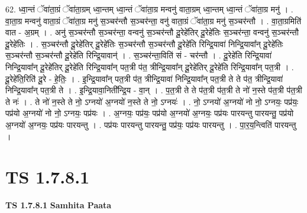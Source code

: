\documentclass[17pt]{extarticle}
\begin{document}
62. ध्वा॒न्तं ॅवा॑ता॒ग्रं ॅवा॑ता॒ग्रम् ध्वा॒न्तम् ध्वा॒न्तं ॅवा॑ता॒ग्र मन्वनु॑ वाता॒ग्रम् ध्वा॒न्तम् ध्वा॒न्तं ॅवा॑ता॒ग्र मनु॑ । . वा॒ता॒ग्र मन्वनु॑ वाता॒ग्रं ॅवा॑ता॒ग्र मनु॑ स॒ञ्चर॑न्तौ स॒ञ्चर॑न्ता॒ वनु॑ वाता॒ग्रं ॅवा॑ता॒ग्र मनु॑ स॒ञ्चर॑न्तौ । . वा॒ता॒ग्रमिति॑ वात - अ॒ग्रम् । . अनु॑ स॒ञ्चर॑न्तौ स॒ञ्चर॑न्ता॒ वन्वनु॑ स॒ञ्चर॑न्तौ दू॒रेहे॑तिर् दू॒रेहे॑तिः स॒ञ्चर॑न्ता॒ वन्वनु॑ स॒ञ्चर॑न्तौ दू॒रेहे॑तिः । . स॒ञ्चर॑न्तौ दू॒रेहे॑तिर् दू॒रेहे॑तिः स॒ञ्चर॑न्तौ स॒ञ्चर॑न्तौ दू॒रेहे॑ति रिन्द्रि॒यावा॑ निन्द्रि॒यावा᳚न् दू॒रेहे॑तिः स॒ञ्चर॑न्तौ स॒ञ्चर॑न्तौ दू॒रेहे॑ति रिन्द्रि॒यावान्॑ । . स॒ञ्चर॑न्ता॒विति॑ सं - चर॑न्तौ । . दू॒रेहे॑ति रिन्द्रि॒यावा॑ निन्द्रि॒यावा᳚न् दू॒रेहे॑तिर् दू॒रेहे॑ति रिन्द्रि॒यावा᳚न् पत॒त्री प॑त॒ त्रीन्द्रि॒यावा᳚न् दू॒रेहे॑तिर् दू॒रेहे॑ति रिन्द्रि॒यावा᳚न् पत॒त्री । . दू॒रेहे॑ति॒रिति॑ दू॒रे - हे॒तिः॒ । . इ॒न्द्रि॒यावा᳚न् पत॒त्री प॑त॒ त्रीन्द्रि॒यावा॑ निन्द्रि॒यावा᳚न् पत॒त्री ते ते प॑त॒ त्रीन्द्रि॒यावा॑ निन्द्रि॒यावा᳚न् पत॒त्री ते । . इ॒न्द्रि॒यावा॒निती᳚न्द्रि॒य - वा॒न् । . प॒त॒त्री ते ते प॑त॒त्री प॑त॒त्री ते नो॑ न॒स्ते प॑त॒त्री प॑त॒त्री ते नः॑ । . ते नो॑ न॒स्ते ते नो॒ ऽग्नयो॑ अ॒ग्नयो॑ न॒स्ते ते नो॒ ऽग्नयः॑ । . नो॒ ऽग्नयो॑ अ॒ग्नयो॑ नो नो॒ ऽग्नयः॒ पप्र॑यः॒ पप्र॑यो अ॒ग्नयो॑ नो नो॒ ऽग्नयः॒ पप्र॑यः । . अ॒ग्नयः॒ पप्र॑यः॒ पप्र॑यो अ॒ग्नयो॑ अ॒ग्नयः॒ पप्र॑यः पारयन्तु पारयन्तु॒ पप्र॑यो अ॒ग्नयो॑ अ॒ग्नयः॒ पप्र॑यः पारयन्तु । . पप्र॑यः पारयन्तु पारयन्तु॒ पप्र॑यः॒ पप्र॑यः पारयन्तु । . पा॒र॒य॒न्त्विति॑ पारयन्तु । \newline
\pagebreak
{}

\section{ TS 1.7.8.1 }

\textbf{TS 1.7.8.1 } \newline
\textbf{Samhita Paata} \newline
\end{document}
